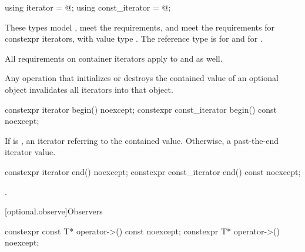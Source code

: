 %
%
\begin{itemdecl}
using iterator       = @\impdef@;
using const_iterator = @\impdef@;
\end{itemdecl}

\begin{itemdescr}
\pnum
These types
model ,
meet the  requirements, and
meet the requirements for constexpr iterators,
with value type .
The reference type is  for  and
 for .

\pnum
All requirements on container iterators apply to
 and  as well.

\pnum
Any operation that initializes or destroys the contained value of an optional object invalidates all iterators into that object.
\end{itemdescr}

%
\begin{itemdecl}
constexpr iterator begin() noexcept;
constexpr const_iterator begin() const noexcept;
\end{itemdecl}

\begin{itemdescr}
\pnum
\returns
If  is ,
an iterator referring to the contained value.
Otherwise, a past-the-end iterator value.
\end{itemdescr}

%
\begin{itemdecl}
constexpr iterator end() noexcept;
constexpr const_iterator end() const noexcept;
\end{itemdecl}

\begin{itemdescr}
\pnum
\returns
{}.
\end{itemdescr}

[optional.observe]{Observers}

%
\begin{itemdecl}
constexpr const T* operator->() const noexcept;
constexpr T* operator->() noexcept;
\end{itemdecl}


